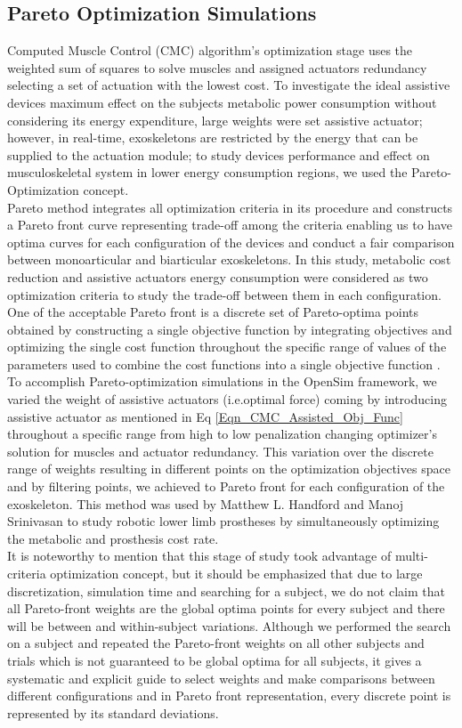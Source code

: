 \documentclass[10pt,letterpaper]{article}
\begin{document}
\subsection*{Pareto Optimization Simulations}
Computed Muscle Control (CMC) algorithm's optimization stage uses the weighted sum of squares to solve muscles and assigned actuators redundancy selecting a set of actuation with the lowest cost. To investigate the ideal assistive devices maximum effect on the subjects metabolic power consumption without considering its energy expenditure, large weights were set assistive actuator; however, in real-time, exoskeletons are restricted by the energy that can be supplied to the actuation module; to study devices performance and effect on musculoskeletal system in lower energy consumption regions, we used the Pareto-Optimization concept\cite{113}.\\
Pareto method integrates all optimization criteria in its procedure and constructs a Pareto front curve representing trade-off among the criteria enabling us to have optima curves for each configuration of the devices \cite{107} and conduct a fair comparison between monoarticular and biarticular exoskeletons. In this study, metabolic cost reduction and assistive actuators energy consumption were considered as two optimization criteria to study the trade-off between them in each configuration.\\
One of the acceptable Pareto front is a discrete set of Pareto-optima points obtained by constructing a single objective function by integrating objectives and optimizing the single cost function throughout the specific range of values of the parameters used to combine the cost functions into a single objective function \cite{108}. To accomplish Pareto-optimization simulations in the OpenSim framework, we varied the weight of assistive actuators (i.e.optimal force) coming by introducing assistive actuator as mentioned in Eq \ref{Eqn_CMC_Assisted_Obj_Func} throughout a specific range from high to low penalization changing optimizer's solution for muscles and actuator redundancy. This variation over the discrete range of weights resulting in different points on the optimization objectives space and by filtering points, we achieved to Pareto front for each configuration of the exoskeleton. This method was used by Matthew L. Handford and Manoj Srinivasan\cite{111,127} to study robotic lower limb prostheses by simultaneously optimizing the metabolic and prosthesis cost rate. \\
It is noteworthy to mention that this stage of study took advantage of multi-criteria optimization concept, but it should be emphasized that due to large discretization, simulation time and searching for a subject, we do not claim that all Pareto-front weights are the global optima points for every subject and there will be between and within-subject variations. Although we performed the search on a subject and repeated the Pareto-front weights on all other subjects and trials which is not guaranteed to be global optima for all subjects, it gives a systematic and explicit guide to select weights and make comparisons between different configurations and in Pareto front representation, every discrete point is represented by its standard deviations.\\
\end{document}
